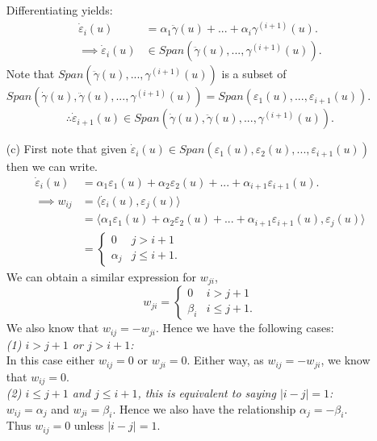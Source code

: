\documentclass[a4paper]{article}
\newcommand{\ip}[2]{\langle #1, #2 \rangle}
\newcommand{\e}[1]{\varepsilon_{#1}(u)}
\newcommand{\dote}[1]{\dot{\varepsilon}_{#1}(u)}
\begin{document}
\begin{enumerate}[leftmargin=\labelsep]
	Differentiating yields:
	\begin{align*}
		\dote{i} & = \alpha_1 \ddot{\gamma}(u) + ... + \alpha_i \gamma^{(i + 1)}(u). \\
		\implies \dote{i} & \in Span(\ddot{\gamma}(u), ... ,\gamma^{(i + 1)}(u)).
	\end{align*}
		Note that $Span(\ddot{\gamma}(u), ... ,\gamma^{(i + 1)}(u))$ is a subset of $Span(\dot{\gamma}(u), \ddot{\gamma}(u), ..., \gamma^{(i + 1)}(u)) = Span(\e{1}, ... , \e{i + 1}).$
		$$\therefore \dote{i+1} \in Span(\dot{\gamma}(u), \ddot{\gamma}(u), ..., \gamma^{(i + 1)}(u)).$$
\item[(c)]
	First note that given $\dote{i} \in Span(\e{1}, \e{2}, ... , \e{i + 1})$ then we can write.
	\begin{align*}
		\dote{i} & = \alpha_1 \e{1} + \alpha_2 \e{2} + ... + \alpha_{i + 1} \e{i + 1}. \\
		\implies w_{ij} & = \ip{\dote{i}}{\e{j}} \\
		& = \ip{\alpha_1 \e{1} + \alpha_2 \e{2} + ... + \alpha_{i + 1} \e{i + 1}}{\e{j}} \\
		& = \begin{cases}
			0 & j > i + 1 \\
			\alpha_j & j \leq i + 1.
		\end{cases}
	\end{align*}
	We can obtain a similar expression for $w_{ji}$,
	$$w_{ji} = \begin{cases}
			0 & i > j + 1 \\
			\beta_i & i \leq j + 1.
		\end{cases}$$
	We also know that $w_{ij} = -w_{ji}$. Hence we have the following cases: \\ [1mm]
	\textit{(1) $i > j + 1$ or $j > i + 1$:} \\ [1mm]
		In this case either $w_{ij} = 0$ or $w_{ji} = 0$. Either way, as $w_{ij} = -w_{ji}$, we know that $w_{ij} = 0$. \\ [1mm]
	\textit{(2) $i \leq j + 1$ and $j \leq i + 1$, this is equivalent to saying $|i - j| = 1$:} \\ [1mm]
	$w_{ij} = \alpha_j$ and $w_{ji} = \beta_i$. Hence we also have the relationship $\alpha_j = -\beta_i$. \\ [1.5mm]
	Thus $w_{ij} = 0$ unless $|i - j| = 1$.


\end{enumerate}
\end{document}
